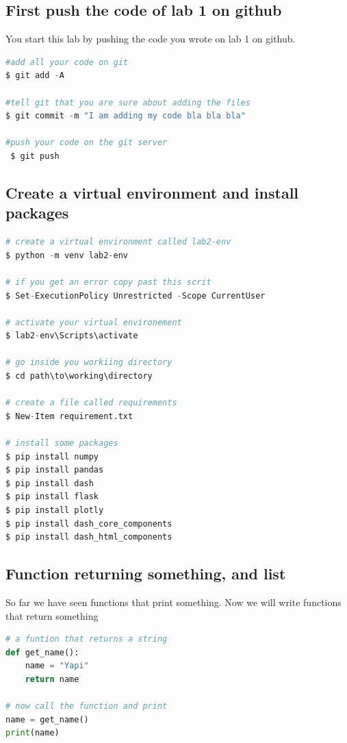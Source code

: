\documentclass[10pt,a4paper,titlepage]{article}
\begin{document}
\subsection{First push the code of lab 1 on github} 
You start this lab by pushing the code you wrote on lab 1 on github.

\begin{lstlisting}[language=python]
#add all your code on git
$ git add -A

#tell git that you are sure about adding the files
$ git commit -m "I am adding my code bla bla bla"

#push your code on the git server
 $ git push
\end{lstlisting}

\subsection{Create a virtual environment and install packages}
\begin{lstlisting}[language=python]
# create a virtual environment called lab2-env
$ python -m venv lab2-env

# if you get an error copy past this scrit
$ Set-ExecutionPolicy Unrestricted -Scope CurrentUser

# activate your virtual environement
$ lab2-env\Scripts\activate

# go inside you workiing directory
$ cd path\to\working\directory

# create a file called requirements
$ New-Item requirement.txt

# install some packages
$ pip install numpy
$ pip install pandas
$ pip install dash
$ pip install flask
$ pip install plotly
$ pip install dash_core_components
$ pip install dash_html_components

\end{lstlisting}
\subsection{Function returning something, and list}
So far we have seen functions that print something. Now we will write functions that return something
\begin{lstlisting}[language=python]
# a funtion that returns a string
def get_name():
	name = "Yapi"
	return name
	
# now call the function and print
name = get_name()
print(name)
\end{lstlisting}
\end{document}
